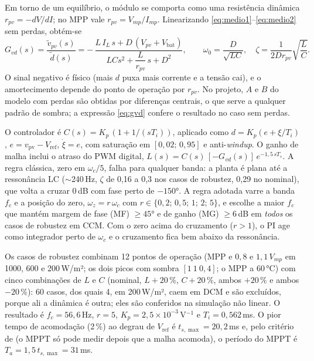 \documentclass[3p,authoryear]{elsarticle}
\newcommand{\vpv}{v_{\mathrm{pv}}}
\newcommand{\Vref}{V_{\mathrm{ref}}}
\newcommand{\Vbat}{V_{\mathrm{bat}}}
\begin{document}
Em torno de um equilíbrio, o módulo se comporta como uma resistência dinâmica
$r_{pv} = -dV/dI$; no MPP vale $r_{pv} = V_{mp}/I_{mp}$. Linearizando
\eqref{eq:medio1}--\eqref{eq:medio2} sem perdas, obtém-se
\begin{equation}
G_{vd}(s) = \frac{\tilde v_{pv}(s)}{\tilde d(s)}
= -\,\frac{L\,I_L\,s + D\,(V_{pv}+\Vbat)}{L C s^2 + \dfrac{L}{r_{pv}}\,s + D^2},
\qquad \omega_0 = \frac{D}{\sqrt{LC}},\quad \zeta = \frac{1}{2Dr_{pv}}\sqrt{\frac{L}{C}}.
\label{eq:gvd}
\end{equation}
O sinal negativo é físico (mais $d$ puxa mais corrente e a tensão cai), e o amortecimento
depende do ponto de operação por $r_{pv}$. No projeto, $A$ e $B$ do modelo com perdas são
obtidas por diferenças centrais, o que serve a qualquer padrão de sombra; a expressão
\eqref{eq:gvd} confere o resultado no caso sem perdas.

O controlador é $C(s) = K_p\,(1 + 1/(sT_i))$, aplicado como
$d = K_p(e + \xi/T_i)$, $e = \vpv - \Vref$, $\dot\xi = e$, com saturação em
$[0{,}02;\,0{,}95]$ e anti-\emph{windup}. O ganho de malha inclui o atraso do PWM digital,
$L(s) = C(s)\,[-G_{vd}(s)]\,e^{-1{,}5\,sT_s}$. A regra clássica, zero em $\omega_c/5$, falha
para qualquer banda: a planta é plana até a ressonância LC ($\sim$240\,Hz, $\zeta$ de 0,16 a 0,3 nos casos de robustez,
0,29 no nominal), que volta a cruzar 0\,dB com fase perto de $-150°$. A regra adotada varre a banda
$f_c$ e a posição do zero, $\omega_z = r\,\omega_c$ com $r \in \{0{,}2;\,0{,}5;\,1;\,2;\,5\}$, e
escolhe a maior $f_c$ que mantém margem de fase (MF) $\ge 45°$ e de ganho (MG) $\ge 6$\,dB em
\emph{todos} os casos de robustez em CCM. Com o zero acima do cruzamento ($r > 1$), o PI age
como integrador perto de $\omega_c$ e o cruzamento fica bem abaixo da ressonância.

Os casos de robustez combinam 12 pontos de operação (MPP e $0{,}8$ e $1{,}1\,V_{mp}$ em 1000,
600 e 200\,W/m²; os dois picos com sombra $[1\ 1\ 0{,}4]$; o MPP a 60\,°C) com cinco
combinações de $L$ e $C$ (nominal, $L{+}20\,\%$, $C{+}20\,\%$, ambos $+20\,\%$ e ambos
$-20\,\%$): 60 casos, dos quais 4, em 200\,W/m², caem em DCM e são excluídos, porque ali a
dinâmica é outra; eles são conferidos na simulação não linear. O resultado é
$f_c = 56{,}6$\,Hz, $r = 5$, $K_p = 2{,}5\times10^{-3}$\,V$^{-1}$ e $T_i = 0{,}562$\,ms. O pior
tempo de acomodação (2\,\%) ao degrau de $\Vref$ é $t_{s,\max} = 20{,}2$\,ms e, pelo critério
de \citet{femia} (o MPPT só pode medir depois que a malha acomoda), o período do MPPT é
$T_a = 1{,}5\,t_{s,\max} = 31$\,ms.
\end{document}

